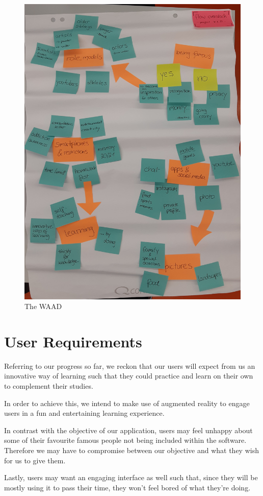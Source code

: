 \documentclass[12pt]{scrartcl}
\begin{document}
\begin{figure}[H]
	\centering
	\includegraphics[scale = 0.12]{../images/WAAD.jpg}
	\caption{The WAAD}
	\label{WAAD}
\end{figure}

\section*{User Requirements}
	Referring to our progress so far, we reckon that our users will expect from us an innovative way
	of learning such that they could practice and learn on their own to complement their studies.
	
	In order to achieve this, we intend to make use of augmented reality to engage users in a fun
	and entertaining learning experience.
	
	In contrast with the objective of our application, users may feel unhappy about some of their
	favourite famous people not being included within the software. Therefore we may have to
	compromise between our objective and what they wish for us to give them.
	
	Lastly, users may want an engaging interface as well such that, since they will be mostly using it
	to pass their time, they won't feel bored of what they're doing.
\end{document}
